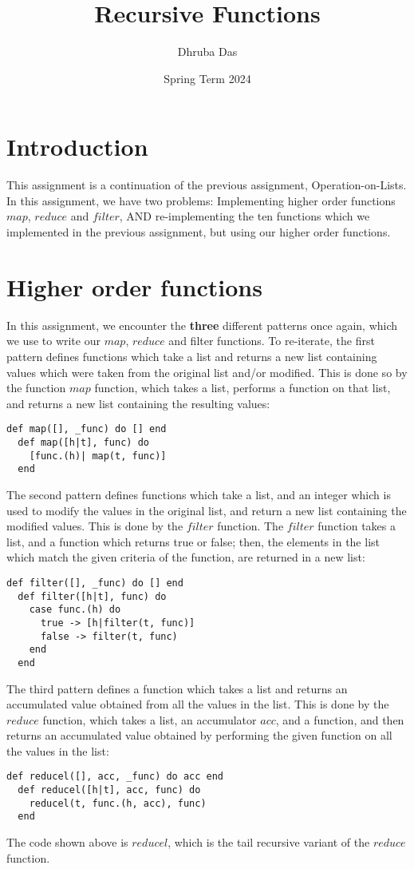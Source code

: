 \documentclass[a4paper,11pt]{article}
\begin{document}
\title{
    \textbf{Recursive Functions}
}
\author{Dhruba Das}
\date{Spring Term 2024}

\maketitle

\section*{Introduction}
This assignment is a continuation of the previous assignment, Operation-on-Lists. In this assignment, we have two problems: Implementing higher order functions $map$, $reduce$ and $filter$, AND re-implementing the ten functions which we implemented in the previous assignment, but using our higher order functions.

\section*{Higher order functions}
In this assignment, we encounter the \textbf{three} different patterns once again, which we use to write our $map$, $reduce$ and filter functions. To re-iterate, the first pattern defines functions which take a list and returns a new list containing values which were taken from the original list and/or modified. This is done so by the function $map$ function, which takes a list, performs a function on that list, and returns a new list containing the resulting values:
\begin{verbatim}
def map([], _func) do [] end
  def map([h|t], func) do
    [func.(h)| map(t, func)]
  end
\end{verbatim}

The second pattern defines functions which take a list, and an integer which is used to modify the values in the original list, and return a new list containing the modified values. This is done by the $filter$ function. The $filter$ function takes a list, and a function which returns true or false; then, the elements in the list which match the given criteria of the function, are returned in a new list: 
\begin{verbatim}
def filter([], _func) do [] end
  def filter([h|t], func) do
    case func.(h) do
      true -> [h|filter(t, func)]
      false -> filter(t, func)
    end
  end
\end{verbatim}

The third pattern defines a function which takes a list and returns an accumulated value obtained from all the values in the list. This is done by the $reduce$ function, which takes a list, an accumulator $acc$, and a function, and then returns an accumulated value obtained by performing the given function on all the values in the list:
\begin{verbatim}
def reducel([], acc, _func) do acc end
  def reducel([h|t], acc, func) do
    reducel(t, func.(h, acc), func)
  end
\end{verbatim} 
The code shown above is $reducel$, which is the tail recursive variant of the $reduce$ function.
\end{document}
